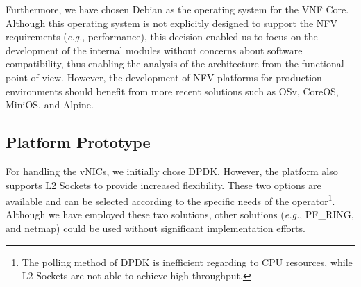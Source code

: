 \begin{itemize}
\end{itemize}

Furthermore, we have chosen Debian as the operating system for the VNF Core. Although this operating system is not explicitly designed to support the NFV requirements (\textit{e.g.}, performance), this decision enabled us to focus on the development of the internal modules without concerns about software compatibility, thus enabling the analysis of the architecture from the functional point-of-view. However, the development of NFV platforms for production environments should benefit from more recent solutions such as  OSv, CoreOS, MiniOS, and Alpine.



\subsection{Platform Prototype}


For handling the vNICs, we initially chose DPDK. However, the platform also supports L2 Sockets to provide increased flexibility. These two options are available and can be selected according to the specific needs of the operator\footnote{The polling method of DPDK is inefficient regarding to CPU resources, while L2 Sockets are not able to achieve high throughput.}. Although we have employed these two solutions, other solutions (\textit{e.g.}, PF\_RING, and netmap) could be used without significant implementation efforts.


